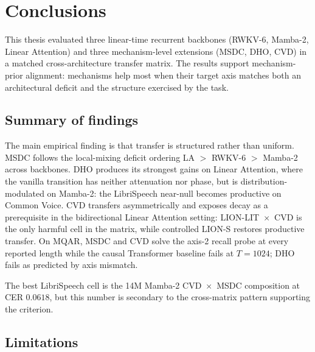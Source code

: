 \chapter{Conclusions}\label{ch:conclusions}

This thesis evaluated three linear-time recurrent backbones
(RWKV-6, Mamba-2, Linear Attention) and three mechanism-level
extensions (MSDC, DHO, CVD) in a matched cross-architecture
transfer matrix. The results support mechanism-prior alignment:
mechanisms help most when their target axis matches both an
architectural deficit and the structure exercised by the task.

\section{Summary of findings}\label{sec:conclusions:summary}

The main empirical finding is that transfer is structured rather
than uniform. MSDC follows the local-mixing deficit ordering
LA $>$ RWKV-6 $>$ Mamba-2 across backbones. DHO produces its
strongest gains on Linear Attention, where the vanilla transition
has neither attenuation nor phase, but is distribution-modulated
on Mamba-2: the LibriSpeech near-null becomes productive on
Common Voice. CVD transfers asymmetrically and exposes decay as a
prerequisite in the bidirectional Linear Attention setting:
LION-LIT~$\times$~CVD is the only harmful cell in the matrix,
while controlled LION-S restores productive transfer. On MQAR,
MSDC and CVD solve the axis-2 recall probe at every reported
length while the causal Transformer baseline fails at $T = 1024$;
DHO fails as predicted by axis mismatch.

The best LibriSpeech cell is the 14M Mamba-2 CVD~$\times$~MSDC
composition at CER $0.0618$, but this number is secondary to the
cross-matrix pattern supporting the criterion.

\section{Limitations}\label{sec:conclusions:limitations}

